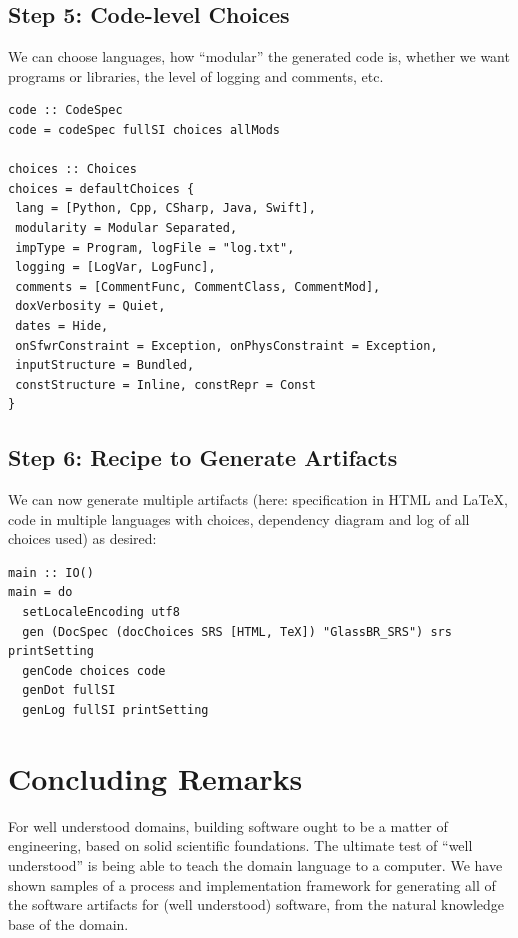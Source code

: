 \documentclass[sigconf,review,anonymous=false]{acmart}
\begin{document}
\subsection*{Step 5: Code-level Choices}

We can choose languages, how ``modular'' the generated code is, whether we
want programs or libraries, the level of logging and comments, etc.

\begin{lstlisting}
code :: CodeSpec
code = codeSpec fullSI choices allMods

choices :: Choices
choices = defaultChoices {
 lang = [Python, Cpp, CSharp, Java, Swift], 
 modularity = Modular Separated,
 impType = Program, logFile = "log.txt", 
 logging = [LogVar, LogFunc],
 comments = [CommentFunc, CommentClass, CommentMod], 
 doxVerbosity = Quiet,
 dates = Hide, 
 onSfwrConstraint = Exception, onPhysConstraint = Exception,
 inputStructure = Bundled, 
 constStructure = Inline, constRepr = Const
}
\end{lstlisting}

\subsection*{Step 6: Recipe to Generate Artifacts}

We can now generate multiple artifacts (here: specification in HTML and \LaTeX,
code in multiple languages with choices, dependency diagram and log of all
choices used) as desired:

\begin{lstlisting}
main :: IO()
main = do
  setLocaleEncoding utf8
  gen (DocSpec (docChoices SRS [HTML, TeX]) "GlassBR_SRS") srs printSetting
  genCode choices code
  genDot fullSI
  genLog fullSI printSetting
\end{lstlisting}

\section{Concluding Remarks} \label{ch:concluding_remarks}

For well understood domains, building software ought to be a matter of
engineering, based on solid scientific foundations. The ultimate test of ``well
understood'' is being able to teach the domain language to a computer. We have
shown samples of a process and implementation framework for generating all of
the software artifacts for (well understood) software, from the natural
knowledge base of the domain.
\end{document}
